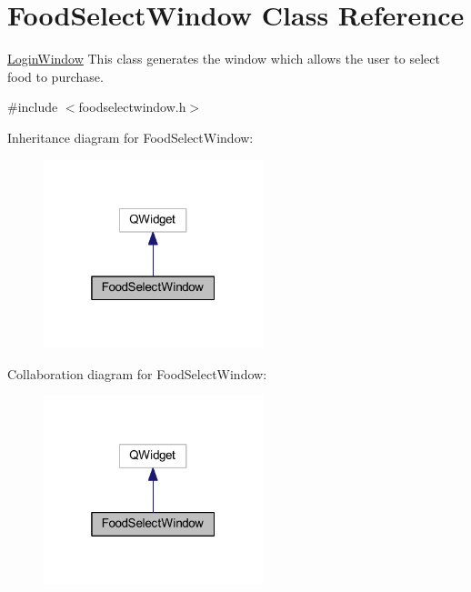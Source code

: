 \hypertarget{class_food_select_window}{}\section{Food\+Select\+Window Class Reference}
\label{class_food_select_window}


\mbox{\hyperlink{class_login_window}{Login\+Window}} This class generates the window which allows the user to select food to purchase.  




{\ttfamily \#include $<$foodselectwindow.\+h$>$}



Inheritance diagram for Food\+Select\+Window\+:
\nopagebreak
\begin{figure}[H]
\begin{center}
\leavevmode
\includegraphics[width=181pt]{class_food_select_window__inherit__graph}
\end{center}
\end{figure}


Collaboration diagram for Food\+Select\+Window\+:
\nopagebreak
\begin{figure}[H]
\begin{center}
\leavevmode
\includegraphics[width=181pt]{class_food_select_window__coll__graph}
\end{center}
\end{figure}
